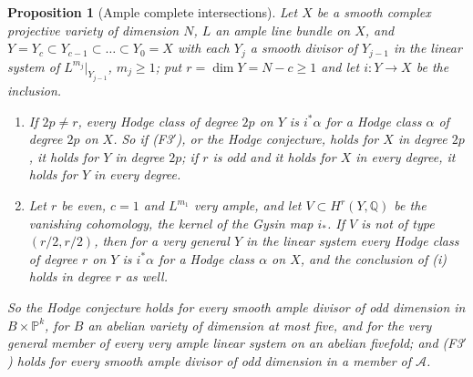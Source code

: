 \documentclass[11pt,reqno]{amsart}
\theoremstyle{plain}
\newtheorem{proposition}[theorem]{Proposition}
\theoremstyle{definition}
\theoremstyle{remark}
\newcommand{\QQ}{\mathbb{Q}}
\newcommand{\PP}{\mathbb{P}}
\begin{document}
\begin{proposition}[Ample complete intersections]
\label{prop:f3primeample}
Let $X$ be a smooth complex projective variety of dimension $N$, $L$ an
ample line bundle on $X$, and $Y=Y_{c}\subset Y_{c-1}\subset\dots\subset
Y_{0}=X$ with each $Y_{j}$ a smooth divisor of $Y_{j-1}$ in the linear
system of $L^{m_{j}}|_{Y_{j-1}}$, $m_{j}\ge1$; put $r=\dim Y=N-c\ge1$ and
let $i\colon Y\to X$ be the inclusion.
\begin{enumerate}[label=\textup{(\roman*)},leftmargin=2.6em,itemsep=2pt]
\item If $2p\ne r$, every Hodge class of degree $2p$ on $Y$ is $i^{*}\alpha$
  for a Hodge class $\alpha$ of degree $2p$ on $X$. So if \textup{(F3$'$)}, or
  the Hodge conjecture, holds for $X$ in degree $2p$, it holds for $Y$ in
  degree $2p$; if $r$ is odd and it holds for $X$ in every degree, it holds
  for $Y$ in every degree.
\item Let $r$ be even, $c=1$ and $L^{m_{1}}$ very ample, and let
  $V\subset H^{r}(Y,\QQ)$ be the vanishing cohomology, the kernel of the
  Gysin map $i_{*}$. If $V$ is not of type $(r/2,r/2)$, then for a very
  general $Y$ in the linear system every Hodge class of degree $r$ on $Y$ is
  $i^{*}\alpha$ for a Hodge class $\alpha$ on $X$, and the conclusion of (i)
  holds in degree $r$ as well.
\end{enumerate}
So the Hodge conjecture holds for every smooth ample divisor of odd dimension
in $B\times\PP^{k}$, for $B$ an abelian variety of dimension at most five, and
for the very general member of every very ample linear system on an abelian
fivefold; and \textup{(F3$'$)} holds for every smooth ample divisor of odd
dimension in a member of $\mathcal{A}$.
\end{proposition}
\end{document}

